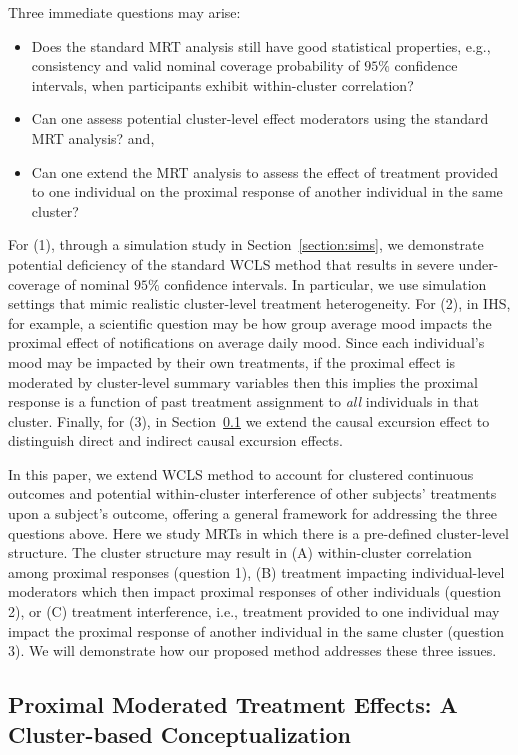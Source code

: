 \documentclass[12pt]{article}
\begin{document}
Three immediate questions may arise:
\begin{itemize}
    \item[(1)] Does the standard MRT analysis still have good statistical properties, e.g., consistency and valid nominal coverage probability of $95\%$ confidence intervals, when participants exhibit within-cluster correlation?
    \item[(2)] Can one assess potential cluster-level effect moderators using the standard MRT analysis? and,
    \item[(3)] Can one extend the MRT analysis to assess the effect of treatment provided to one individual on the proximal response of another individual in the same cluster?
\end{itemize}
  For (1), through a simulation study in Section~\ref{section:sims}, we demonstrate potential deficiency of the standard WCLS method that results in severe under-coverage of nominal $95\%$ confidence intervals. In particular, we use simulation settings that mimic realistic cluster-level treatment heterogeneity.  For (2), in IHS, for example, a scientific question may be how group average mood impacts the proximal effect of notifications on average daily mood.  Since each individual's mood may be impacted by their own treatments, if the proximal effect is moderated by cluster-level summary variables then this implies the proximal response is a function of past treatment assignment to \emph{all} individuals in that cluster.  Finally, for (3), in Section~\ref{section:prox_effects_pot_outcome} we extend the causal excursion effect to distinguish direct and indirect causal excursion effects.

In this paper, we extend WCLS method \citep{Boruvkaetal} to  account for clustered continuous outcomes and potential within-cluster interference of other subjects' treatments upon a subject's outcome, offering a general framework for addressing the three questions above. Here we study MRTs in which there is a pre-defined cluster-level structure.  The cluster structure may result in (A) within-cluster correlation among proximal responses (question 1), (B) treatment impacting individual-level moderators which then impact proximal responses of other individuals (question 2), or (C) treatment interference, i.e., treatment provided to one individual may impact the proximal response of another individual in the same cluster (question 3).  We will demonstrate how our proposed method addresses these three issues.


\subsection{Proximal Moderated Treatment Effects: A Cluster-based Conceptualization}
\label{section:prox_effects_pot_outcome}
\end{document}
